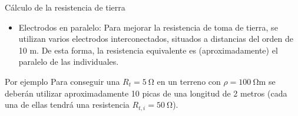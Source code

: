 \documentclass[xcolor={usenames,svgnames,dvipsnames}]{beamer}
\begin{document}
\begin{frame}[label={sec:orgd2fa445}]{Cálculo de la resistencia de tierra}
\begin{itemize}
\item \alert{Electrodos en paralelo}: Para mejorar la resistencia de toma de
tierra, se utilizan varios electrodos interconectados, situados a
distancias del orden de 10 m. De esta forma, \alert{la resistencia
equivalente es (aproximadamente) el paralelo de las individuales}.
\end{itemize}

\begin{block}{Por ejemplo}
Para conseguir una \(R_{t}=\SI{5}{\ohm}\) en un terreno con
\(\rho=\SI{100}{\ohm\meter}\) se deberán utilizar aproximadamente 10
picas de una longitud de 2 metros (cada una de ellas tendrá una
resistencia \(R_{t,i}=\SI{50}{\ohm}\)).
\end{block}
\end{frame}
\end{document}
